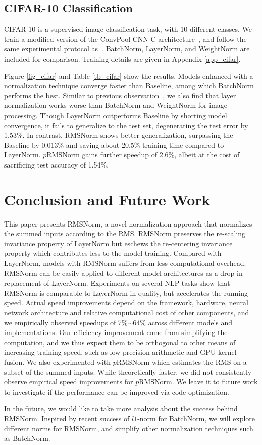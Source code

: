 \subsection{CIFAR-10 Classification}

CIFAR-10 is a supervised image classification task, with 10 different classes. We train a modified version of the ConvPool-CNN-C architecture~\cite{krizhevsky2009learning}, and follow the same experimental protocol as~\citet{NIPS2016_6114}. BatchNorm, LayerNorm, and WeightNorm are included for comparison. Training details are given in Appendix \ref{app_cifar}.

Figure \ref{fig_cifar} and Table \ref{tb_cifar} show the results. Models enhanced with a normalization technique converge faster than Baseline, among which BatchNorm performs the best. Similar to previous observation~\cite{ba2016layer}, we also find that layer normalization works worse than BatchNorm and WeightNorm for image processing. Though LayerNorm outperforms Baseline by shorting model convergence, it fails to generalize to the test set, degenerating the test error by 1.53\%. In contrast, RMSNorm shows better generalization, surpassing the Baseline by 0.013\% and saving about 20.5\% training time compared to LayerNorm. $p$RMSNorm gains further speedup of 2.6\%, albeit at the cost of sacrificing test accuracy of 1.54\%.

\section{Conclusion and Future Work}

This paper presents RMSNorm, a novel normalization approach that normalizes the summed inputs according to the RMS. RMSNorm preserves the re-scaling invariance property of LayerNorm but eschews the re-centering invariance property which contributes less to the model training. Compared with LayerNorm, models with RMSNorm suffers from less computational overhead. RMSNorm can be easily applied to different model architectures as a drop-in replacement of LayerNorm. Experiments on several NLP tasks show that RMSNorm is comparable to LayerNorm in quality, but accelerates the running speed. Actual speed improvements depend on the framework, hardware, neural network architecture and relative computational cost of other components, and we empirically observed speedups of 7\%$\sim$64\% across different models and implementations. Our efficiency improvement come from simplifying the computation, and we thus expect them to be orthogonal to other means of increasing training speed, such as low-precision arithmetic and GPU kernel fusion. We also experimented with $p$RMSNorm which estimates the RMS on a subset of the summed inputs. While theoretically faster, we did not consistently observe empirical speed improvements for $p$RMSNorm. We leave it to future work to investigate if the performance can be improved via code optimization. 

In the future, we would like to take more analysis about the success behind RMSNorm. Inspired by recent success of $l1$-norm for BatchNorm, we will explore different norms for RMSNorm, and simplify other normalization techniques such as BatchNorm.


